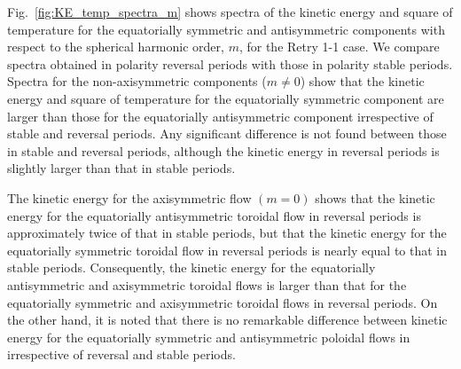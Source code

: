 
% 


Fig.~\ref{fig:KE_temp_spectra_m} shows spectra of the kinetic energy and square of temperature for the equatorially symmetric and antisymmetric components
with respect to the spherical harmonic order, $m$, for the Retry 1-1 case.
We compare spectra obtained in polarity reversal periods with those in polarity stable periods.
Spectra for the non-axisymmetric components ($m \ne 0$) show that the kinetic energy and square of temperature for the equatorially symmetric component are larger than those for the equatorially antisymmetric component irrespective of stable and reversal periods.
Any significant difference is not found between those in stable and reversal periods, although the kinetic energy in reversal periods is slightly larger than that in stable periods.

{\color{teal}
The kinetic energy for the axisymmetric flow $(m = 0)$ shows that the kinetic energy for the equatorially antisymmetric toroidal flow in reversal periods is approximately twice of that in stable periods, but that the kinetic energy for the equatorially symmetric toroidal flow in reversal periods is nearly equal to that in stable periods.
}
Consequently, the kinetic energy for the equatorially antisymmetric and axisymmetric toroidal flows is larger than that for the equatorially symmetric and  axisymmetric toroidal flows in reversal periods.
{\color{teal}
On the other hand,
}
it is noted that there is no remarkable difference between kinetic energy for the equatorially symmetric and antisymmetric poloidal flows in irrespective of reversal and stable periods.

